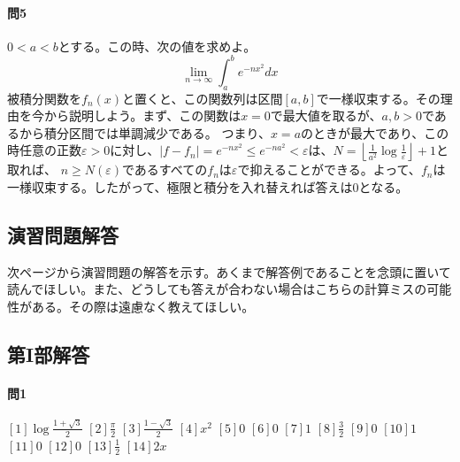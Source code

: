 \documentclass[a4j,dvipdfmx]{jsarticle}
\begin{document}
                \paragraph{問5}$0<a<b$とする。この時、次の値を求めよ。
                    \begin{equation*}
                        \lim_{n\to\infty}\int_{a}^{b}e^{-nx^2}dx
                    \end{equation*}
                    被積分関数を$f_n(x)$と置くと、この関数列は区間$[a,b]$で一様収束する。その理由を今から説明しよう。まず、この関数は$x=0$で最大値を取るが、$a,b>0$であるから積分区間では単調減少である。
                    つまり、$x=a$のときが最大であり、この時任意の正数$\varepsilon>0$に対し、$|f-f_n|=e^{-nx^2}\leq e^{-na^2}<\varepsilon$は、$\displaystyle N=\left\lfloor\frac{1}{a^2}\log\frac{1}{\varepsilon}\right\rfloor +1$と取れば、
                    $n\geq N(\varepsilon)$であるすべての$f_n$は$\varepsilon$で抑えることができる。よって、$f_n$は一様収束する。したがって、極限と積分を入れ替えれば答えは$0$となる。
            \clearpage

        \clearpage
        \subsection{演習問題解答}
            次ページから演習問題の解答を示す。あくまで解答例であることを念頭に置いて読んでほしい。また、どうしても答えが合わない場合はこちらの計算ミスの可能性がある。その際は遠慮なく教えてほしい。
            \clearpage
            \subsection*{第I部解答}
                \paragraph{問1}
                    $[1]\log\frac{1+\sqrt{3}}{2}$\hspace{1mm}
                    $[2]\frac{\pi}{2}$\hspace{1mm}
                    $[3]\frac{1-\sqrt{3}}{2}$\hspace{1mm}
                    $[4]x^2$\hspace{1mm}
                    $[5]0$\hspace{1mm}
                    $[6]0$\hspace{1mm}
                    $[7]1$\hspace{1mm}
                    $[8]\frac{3}{2}$\hspace{1mm}
                    $[9]0$\hspace{1mm}
                    $[10]1$\hspace{1mm}
                    $[11]0$\hspace{1mm}
                    $[12]0$\hspace{1mm}
                    $[13]\frac{1}{2}$\hspace{1mm}
                    $[14]2x$
\end{document}
